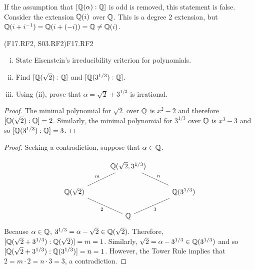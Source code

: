 \documentclass[../../AlgebraQualSolutions.tex]{subfiles}
\begin{document}
If the assumption that $[\mathbb{Q}(\alpha): \mathbb{Q}]$ is odd is removed, this statement is false. Consider the extension $\mathbb{Q}(i)$ over $\mathbb{Q}$. This is a degree 2 extension, but $\mathbb{Q}(i + i^{-1}) = \mathbb{Q}(i + (-i)) = \mathbb{Q} \neq \mathbb{Q}(i)$.

\begin{prob}{(F17.RF2, S03.RF2)}{F17.RF2}
	\begin{enumerate}[(i)]
		\item State Eisenstein's irreducibility criterion for polynomials.
		\item Find $[\mathbb{Q}(\sqrt 2): \mathbb{Q}]$ and $[\mathbb{Q}(3^{1/3}): \mathbb{Q}]$.
		\item Using (ii), prove that $\alpha = \sqrt{2}+3^{1/3}$ is irrational.
	\end{enumerate}
\end{prob}

\begin{proof}
	The minimal polynomial for $\sqrt2$ over $\mathbb{Q}$ is $x^2 - 2$ and therefore $[\mathbb{Q}(\sqrt 2): \mathbb{Q}] =2$. Similarly, the minimal polynomial for $3^{1/3}$ over $\mathbb{Q}$ is $x^3 - 3$ and so $[\mathbb{Q}(3^{1/3}): \mathbb{Q}] = 3$.
\end{proof}

\begin{proof}
	Seeking a contradiction, suppose that $\alpha \in \mathbb{Q}$.

	\[
		\begin{tikzcd}[column sep=1cm]
		  & \Q(\sqrt2,3^{1/3}) & \\
		  \Q(\sqrt2) \ar[ru, no head,"m"]& & \ar[lu, no head,"n"'] \Q(3^{1/3}) \\
		  & \Q \ar[lu, no head, "2"] \ar[ru, no head, "3"']&
		\end{tikzcd}
		\]
	Because $\alpha \in \mathbb{Q}$, $3^{1/3} = \alpha - \sqrt2 \in \mathbb{Q}(\sqrt2)$. Therefore, $[\mathbb{Q}(\sqrt2 + 3^{1/3}): \mathbb{Q}(\sqrt2)] = m = 1$. Similarly, $\sqrt{2} = \alpha - 3^{1/3} \in \mathbb{Q}(3^{1/3})$ and so $[\mathbb{Q}(\sqrt2 + 3^{1/3}): \mathbb{Q}(3^{1/3})] = n = 1$. However, the Tower Rule implies that $2 = m\cdot2 = n\cdot 3 = 3$, a contradiction. 
\end{proof}
\end{document}
